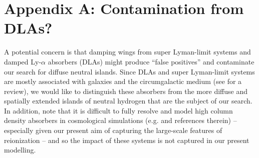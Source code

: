 %
%
%
%
%
%

\section*{Appendix A: Contamination from DLAs?} \label{sec:NeutralIslandsDLA_contam}


A potential concern is that damping wings from super Lyman-limit systems
and damped Ly-$\alpha$ absorbers (DLAs) might produce ``false positives'' and
contaminate our search for diffuse neutral islands.
Since DLAs
and super Lyman-limit systems are mostly associated with galaxies and the
circumgalactic medium (see \citealt{Wolfe:2005jd} for a review), we would like to distinguish these absorbers 
from the more
diffuse and spatially extended islands of neutral hydrogen that are the
subject of our search. In addition, note that it is difficult to fully resolve and model high column density absorbers
in cosmological simulations (e.g. \citealt{Rahmati:2013hsa} and references therein) -- especially given our present aim of capturing the large-scale features
of reionization -- and so the impact of these systems is not captured in our present modelling.

